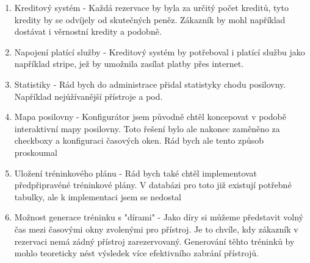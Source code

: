 \begin{enumerate}
	\item Kreditový systém - Každá rezervace by byla za určitý počet kreditů, tyto kredity by se odvíjely od skutečných peněz. Zákazník by mohl například dostávat i věrnostní kredity a podobně.


	\item Napojení platící služby - Kreditový systém by potřeboval i platící službu jako například stripe, jež by umožnila zasílat platby přes internet.

	\item Statistiky - Rád bych do administrace přidal statistyky chodu posilovny. Například nejúžívanější přístroje a pod.

	\item Mapa posilovny - Konfigurátor jsem původně chtěl koncepovat v podobě interaktivní mapy posilovny. Toto řešení bylo ale nakonec zaměněno za checkboxy a konfiguraci časových oken. Rád bych ale tento způsob proskoumal

	\item Uložení tréninkového plánu - Rád bych také chtěl implementovat předpřipravéné tréninkové plány. V databázi pro toto již existují potřebné tabulky, ale k implementaci jsem se nedostal

	\item Možnost generace tréninku s "dírami" - Jako díry si můžeme představit volný čas mezi časovými okny zvolenými pro přístroj. Je to chvíle, kdy zákazník v rezervaci nemá zádný přístroj zarezervovaný. Generování těhto tréninků by mohlo teoreticky nést výsledek více efektivního zabrání přístrojů.
\end{enumerate}
